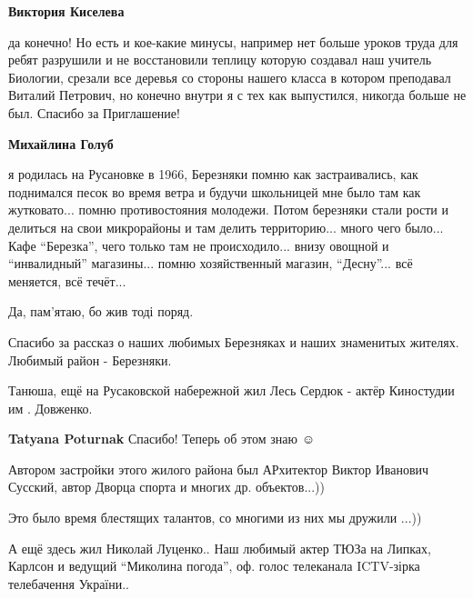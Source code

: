 \begin{itemize}
\begin{itemize}
\begin{itemize} %
\textbf{Виктория Киселева} 

да конечно! Но есть и кое-какие минусы, например нет больше уроков труда для
ребят разрушили и не восстановили теплицу которую создавал наш учитель
Биологии, срезали все деревья со стороны нашего класса в котором преподавал
Виталий Петрович, но конечно внутри я с тех как выпустился, никогда больше не
был. Спасибо за Приглашение!

\end{itemize} %

\textbf{Михайлина Голуб} 

я родилась на Русановке в 1966, Березняки помню как застраивались, как
поднимался песок во время ветра и будучи школьницей мне было там как
жутковато... помню противостояния молодежи. Потом березняки стали рости и
делиться на свои микрорайоны и там делить территорию... много чего было... Кафе
\enquote{Березка}, чего только там не происходило... внизу овощной и \enquote{инвалидный}
магазины... помню хозяйственный магазин, \enquote{Десну}... всё меняется, всё течёт...

\end{itemize} %

Да, пам'ятаю, бо жив тоді поряд.


Спасибо за рассказ о наших любимых Березняках и наших знаменитых жителях.
Любимый район - Березняки.


Танюша, ещё на Русаковской набережной жил Лесь Сердюк - актёр Киностудии им . Довженко.

\textbf{Tatyana Poturnak} Спасибо! Теперь об этом знаю ☺ ️ 


Автором застройки этого жилого района был АРхитектор Виктор Иванович Сусский,
автор Дворца спорта и многих др. объектов...))

Это было время блестящих талантов, со многими из них мы дружили ...))


А ещё здесь жил Николай Луценко.. Наш любимый актер ТЮЗа на Липках, Карлсон и
ведущий \enquote{Миколина погода}, оф. голос телеканала ICTV-зірка телебачення України..



\end{itemize}
